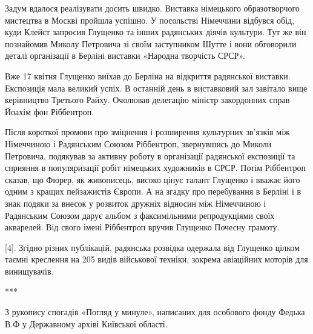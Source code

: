Задум вдалося реалізувати досить швидко. Виставка німецького образотворчого
мистецтва в Москві пройшла успішно. У посольстві Німеччини відбувся обід, куди
Клейст запросив Глущенко та інших радянських діячів культури. Тут же він
познайомив Миколу Петровича зі своїм заступником Шутте і вони обговорили деталі
організації в Берліні виставки «Народна творчість СРСР».

Вже 17 квітня Глущенко виїхав до Берліна на відкриття радянської виставки.
Експозиція мала великий успіх. В останній день в виставковий зал завітало вище
керівництво Третього Райху. Очолював делегацію міністр закордонних справ Йоахім
фон Ріббентроп. 

Після короткої промови про зміцнення і розширення культурних зв'язків між
Німеччиною і Радянським Союзом Ріббентроп, звернувшись до Миколи Петровича,
подякував за активну роботу в організації радянської експозиції та сприяння в
популяризації робіт німецьких художників в СРСР. Потім Ріббентроп сказав, що
Фюрер, як живописець, високо цінує талант Глущенко і вважає його одним з кращих
пейзажистів Європи. А на згадку про перебування в Берліні і в знак подяки за
внесок у розвиток дружніх відносин між Німеччиною і Радянським Союзом дарує
альбом з факсимільними репродукціями своїх акварелей. Від свого імені
Ріббентроп вручив Глущенко Почесну грамоту.

[4]. Згідно різних публікацій, радянська розвідка одержала від Глущенко цілком
таємні креслення на 205 видів військової техніки, зокрема авіаційних моторів
для винищувачів.

***

З рукопису спогадів «Погляд у минуле», написаних для особового фонду Федька В.Ф
у Державному архіві Київської області.

